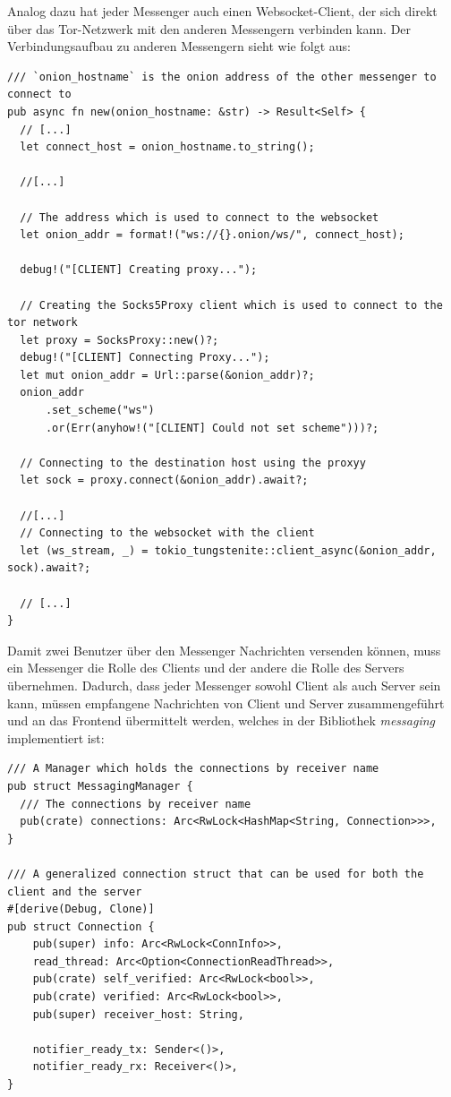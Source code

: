 \documentclass[a4paper,ngerman, headheight=28pt,12pt, footheight=27pt]{scrartcl}
\begin{document}
Analog dazu hat jeder Messenger auch einen Websocket-Client, der sich direkt über das Tor-Netzwerk mit den anderen Messengern verbinden kann. Der Verbindungsaufbau zu anderen Messengern sieht wie folgt aus:
\begin{verbatim}
/// `onion_hostname` is the onion address of the other messenger to connect to
pub async fn new(onion_hostname: &str) -> Result<Self> {
  // [...]
  let connect_host = onion_hostname.to_string();

  //[...]

  // The address which is used to connect to the websocket
  let onion_addr = format!("ws://{}.onion/ws/", connect_host);

  debug!("[CLIENT] Creating proxy...");

  // Creating the Socks5Proxy client which is used to connect to the tor network
  let proxy = SocksProxy::new()?;
  debug!("[CLIENT] Connecting Proxy...");
  let mut onion_addr = Url::parse(&onion_addr)?;
  onion_addr
      .set_scheme("ws")
      .or(Err(anyhow!("[CLIENT] Could not set scheme")))?;

  // Connecting to the destination host using the proxyy
  let sock = proxy.connect(&onion_addr).await?;

  //[...]
  // Connecting to the websocket with the client
  let (ws_stream, _) = tokio_tungstenite::client_async(&onion_addr, sock).await?;

  // [...]
}
\end{verbatim}
Damit zwei Benutzer über den Messenger Nachrichten versenden können, muss ein Messenger die Rolle des Clients und der andere die Rolle des Servers übernehmen. Dadurch, dass jeder Messenger sowohl Client als auch Server sein kann, müssen empfangene Nachrichten von Client und Server zusammengeführt und an das Frontend übermittelt werden, welches in der Bibliothek \textit{messaging} implementiert ist:
\begin{verbatim}
/// A Manager which holds the connections by receiver name
pub struct MessagingManager {
  /// The connections by receiver name
  pub(crate) connections: Arc<RwLock<HashMap<String, Connection>>>,
}

/// A generalized connection struct that can be used for both the client and the server
#[derive(Debug, Clone)]
pub struct Connection {
    pub(super) info: Arc<RwLock<ConnInfo>>,
    read_thread: Arc<Option<ConnectionReadThread>>,
    pub(crate) self_verified: Arc<RwLock<bool>>,
    pub(crate) verified: Arc<RwLock<bool>>,
    pub(super) receiver_host: String,

    notifier_ready_tx: Sender<()>,
    notifier_ready_rx: Receiver<()>,
}
\end{verbatim}
\end{document}
